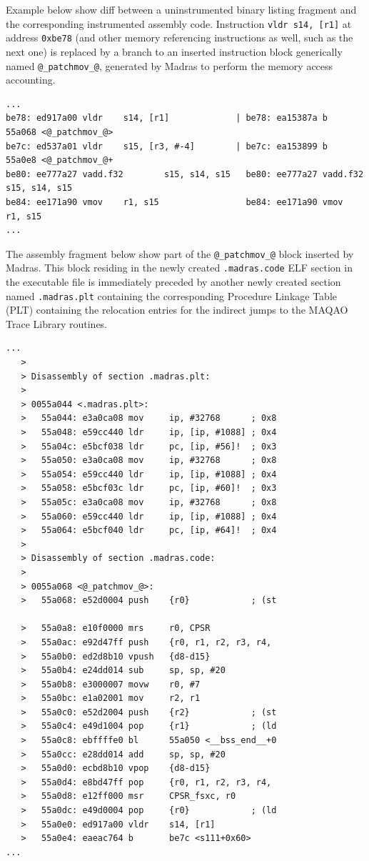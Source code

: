\documentclass[11pt, a4paper, twoside]{montblanc2}
\begin{document}
Example below show diff between a uninstrumented binary listing fragment and the 
corresponding instrumented assembly code. Instruction \verb|vldr s14, [r1]| at 
address \texttt{0xbe78} (and other memory referencing instructions as well, such 
as the next one) is replaced by a branch to an inserted instruction block 
generically named \verb|@_patchmov_@|, generated by Madras to perform the memory 
access accounting.
\begin{footnotesize}
\begin{verbatim}
...
be78: ed917a00 vldr    s14, [r1]             | be78: ea15387a b       55a068 <@_patchmov_@>
be7c: ed537a01 vldr    s15, [r3, #-4]        | be7c: ea153899 b       55a0e8 <@_patchmov_@+
be80: ee777a27 vadd.f32        s15, s14, s15   be80: ee777a27 vadd.f32        s15, s14, s15
be84: ee171a90 vmov    r1, s15                 be84: ee171a90 vmov    r1, s15
...
\end{verbatim}
\end{footnotesize}

The assembly fragment below show part of the \verb|@_patchmov_@| block inserted 
by Madras. This block residing in the newly created \texttt{.madras.code} ELF 
section in the executable file is immediately preceded by another newly created 
section named \texttt{.madras.plt} containing the corresponding Procedure 
Linkage Table (PLT) containing the relocation entries for the indirect jumps to 
the MAQAO Trace Library routines.

\begin{footnotesize}
\begin{verbatim}
...
   >
   > Disassembly of section .madras.plt:
   >
   > 0055a044 <.madras.plt>:
   >   55a044: e3a0ca08 mov     ip, #32768      ; 0x8
   >   55a048: e59cc440 ldr     ip, [ip, #1088] ; 0x4
   >   55a04c: e5bcf038 ldr     pc, [ip, #56]!  ; 0x3
   >   55a050: e3a0ca08 mov     ip, #32768      ; 0x8
   >   55a054: e59cc440 ldr     ip, [ip, #1088] ; 0x4
   >   55a058: e5bcf03c ldr     pc, [ip, #60]!  ; 0x3
   >   55a05c: e3a0ca08 mov     ip, #32768      ; 0x8
   >   55a060: e59cc440 ldr     ip, [ip, #1088] ; 0x4
   >   55a064: e5bcf040 ldr     pc, [ip, #64]!  ; 0x4
   >
   > Disassembly of section .madras.code:
   >
   > 0055a068 <@_patchmov_@>:
   >   55a068: e52d0004 push    {r0}            ; (st

   >   55a0a8: e10f0000 mrs     r0, CPSR
   >   55a0ac: e92d47ff push    {r0, r1, r2, r3, r4, 
   >   55a0b0: ed2d8b10 vpush   {d8-d15}
   >   55a0b4: e24dd014 sub     sp, sp, #20
   >   55a0b8: e3000007 movw    r0, #7
   >   55a0bc: e1a02001 mov     r2, r1
   >   55a0c0: e52d2004 push    {r2}            ; (st
   >   55a0c4: e49d1004 pop     {r1}            ; (ld
   >   55a0c8: ebffffe0 bl      55a050 <__bss_end__+0
   >   55a0cc: e28dd014 add     sp, sp, #20
   >   55a0d0: ecbd8b10 vpop    {d8-d15}
   >   55a0d4: e8bd47ff pop     {r0, r1, r2, r3, r4, 
   >   55a0d8: e12ff000 msr     CPSR_fsxc, r0
   >   55a0dc: e49d0004 pop     {r0}            ; (ld
   >   55a0e0: ed917a00 vldr    s14, [r1]
   >   55a0e4: eaeac764 b       be7c <s111+0x60>
...
\end{verbatim}
\end{footnotesize}
\end{document}
